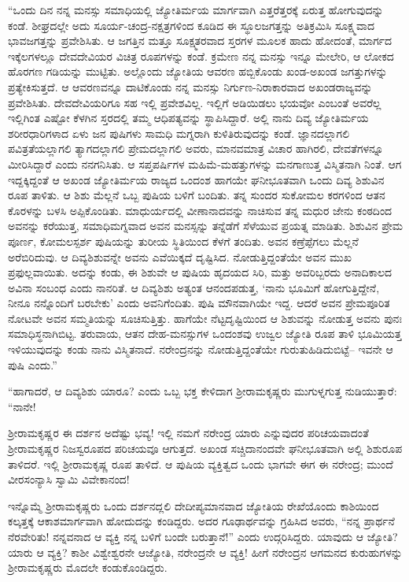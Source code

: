 “ಒಂದು ದಿನ ನನ್ನ ಮನಸ್ಸು ಸಮಾಧಿಯಲ್ಲಿ ಜ್ಯೋತಿರ್ಮಯ ಮಾರ್ಗವಾಗಿ ಎತ್ತರೆತ್ತರಕ್ಕೆ ಏರುತ್ತ ಹೋಗುವುದನ್ನು ಕಂಡೆ. ಶೀಘ್ರದಲ್ಲೇ ಅದು ಸೂರ್ಯ-ಚಂದ್ರ-ನಕ್ಷತ್ರಗಳಿಂದ ಕೂಡಿದ ಈ ಸ್ಥೂಲಜಗತ್ತನ್ನು ಅತಿಕ್ರಮಿಸಿ ಸೂಕ್ಷ್ಮವಾದ ಭಾವಜಗತ್ತನ್ನು ಪ್ರವೇಶಿಸಿತು. ಆ ಜಗತ್ತಿನ ಮತ್ತೂ ಸೂಕ್ಷ್ಮತರವಾದ ಸ್ತರಗಳ ಮೂಲಕ ಹಾದು ಹೋದಂತೆ, ಮಾರ್ಗದ ಇಕ್ಕೆಲಗಳಲ್ಲೂ ದೇವದೇವಿಯರ ವಿಚಿತ್ರ ರೂಪಗಳನ್ನು ಕಂಡೆ. ಕ್ರಮೇಣ ನನ್ನ ಮನಸ್ಸು ಇನ್ನೂ ಮೇಲೇರಿ, ಆ ಲೋಕದ ಹೊರಗಣ ಗಡಿಯನ್ನು ಮುಟ್ಟಿತು. ಅಲ್ಲೊಂದು ಜ್ಯೋತಿಯ ಆವರಣ ಹಬ್ಬಿಕೊಂಡು ಖಂಡ-ಅಖಂಡ ಜಗತ್ತುಗಳನ್ನು ಪ್ರತ್ಯೇಕಿಸುತ್ತದೆ. ಆ ಆವರಣವನ್ನೂ ದಾಟಿಕೊಂಡು ನನ್ನ ಮನಸ್ಸು ನಿರ್ಗುಣ-ನಿರಾಕಾರವಾದ ಅಖಂಡರಾಜ್ಯವನ್ನು ಪ್ರವೇಶಿಸಿತು. ದೇವದೇವಿಯರಿಗೂ ಸಹ ಇಲ್ಲಿ ಪ್ರವೇಶವಿಲ್ಲ. ಇಲ್ಲಿಗೆ ಅಡಿಯಿಡಲು ಭಯವೋ ಎಂಬಂತೆ ಅವರೆಲ್ಲ ಇಲ್ಲಿಗಿಂತ ಎಷ್ಟೋ ಕೆಳಗಿನ ಸ್ತರದಲ್ಲಿ ತಮ್ಮ ಆಧಿಪತ್ಯವನ್ನು ಸ್ಥಾಪಿಸಿದ್ದಾರೆ. ಅಲ್ಲಿ ನಾನು ದಿವ್ಯ ಜ್ಯೋತಿರ್ಮಯ ಶರೀರಧಾರಿಗಳಾದ ಏಳು ಜನ ಪುಷಿಗಳು ಸಾಮಧಿ ಮಗ್ನರಾಗಿ ಕುಳಿತಿರುವುದನ್ನು ಕಂಡೆ. ಜ್ಞಾನದಲ್ಲಾಗಲಿ ಪವಿತ್ರತೆಯಲ್ಲಾಗಲಿ ತ್ಯಾಗದಲ್ಲಾಗಲಿ ಪ್ರೇಮದಲ್ಲಾಗಲಿ ಅವರು, ಮಾನವಮಾತ್ರ ವಿಚಾರ ಹಾಗಿರಲಿ, ದೇವತೆಗಳನ್ನೂ ಮೀರಿಸಿದ್ದಾರೆ ಎಂದು ನನಗನಿಸಿತು. ಆ ಸಪ್ತಪರ್ಷಿಗಳ ಮಹಿಮೆ-ಮಹತ್ತುಗಳನ್ನು ಮನಗಾಣುತ್ತ ವಿಸ್ಮಿತನಾಗಿ ನಿಂತೆ. ಆಗ ಇದ್ದಕ್ಕಿದ್ದಂತೆ ಆ ಅಖಂಡ ಜ್ಯೋತಿರ್ಮಯ ರಾಜ್ಯದ ಒಂದಂಶ ಹಾಗಯೇ ಘನೀಭೂತವಾಗಿ ಒಂದು ದಿವ್ಯ ಶಿಶುವಿನ ರೂಪ ತಾಳಿತು. ಆ ಶಿಶು ಮೆಲ್ಲನೆ ಒಬ್ಬ ಪುಷಿಯ ಬಳಿಗೆ ಬಂದಿತು. ತನ್ನ ಸುಂದರ ಸುಕೋಮಲ ಕರಗಳಿಂದ ಆತನ ಕೊರಳನ್ನು ಬಳಸಿ ಅಪ್ಪಿಕೊಂಡಿತು. ಮಾಧುರ್ಯದಲ್ಲಿ ವೀಣಾನಾದವನ್ನು ನಾಚಿಸುವ ತನ್ನ ಮಧುರ ಜೇನು ಕಂಠದಿಂದ ಅವನನ್ನು ಕರೆಯುತ್ತ, ಸಮಾಧಿಮಗ್ನವಾದ ಅವನ ಮನಸ್ಸನ್ನು ತನ್ನೆಡೆಗೆ ಸೆಳೆಯುವ ಪ್ರಯತ್ನ ಮಾಡಿತು. ಶಿಶುವಿನ ಪ್ರೇಮ ಪೂರ್ಣ, ಕೋಮಲಸ್ಪರ್ಶ ಪುಷಿಯನ್ನು ತುರೀಯ ಸ್ಥಿತಿಯಿಂದ ಕೆಳಗೆ ತಂದಿತು. ಅವನ ಕಣ್ರೆಪ್ಪೆಗಲು ಮೆಲ್ಲನೆ ಅರೆಬಿರಿದುವು. ಆ ದಿವ್ಯಶಿಶುವನ್ನೇ ಅವನು ಎವೆಯಿಕ್ಕದೆ ದೃಷ್ಟಿಸಿದ. ನೋಡುತ್ತಿದ್ದಂತೆಯೇ ಅವನ ಮುಖ ಪ್ರಫುಲ್ಲವಾಯಿತು. ಅದನ್ನು ಕಂಡು, ಈ ಶಿಶುವೇ ಆ ಪುಷಿಯ ಹೃದಯದ ಸಿರಿ, ಮತ್ತು ಅವರಿಬ್ಬರದು ಅನಾದಿಕಾಲದ ಅವಿನಾ ಸಂಬಂಧ ಎಂದು ನಾನರಿತೆ. ಆ ದಿವ್ಯಶಿಶು ಅತ್ಯಂತ ಆನಂದಪಡುತ್ತ, ‘ನಾನು ಭೂಮಿಗೆ ಹೋಗುತ್ತಿದ್ದೇನೆ, ನೀನೂ ನನ್ನೊಂದಿಗೆ ಬರಬೇಕು’ ಎಂದು ಅವನಿಗೆಂದಿತು. ಪುಷಿ ಮೌನವಾಗಿಯೇ ಇದ್ದ. ಆದರೆ ಅವನ ಪ್ರೇಮಪೂರಿತ ನೋಟವೇ ಅವನ ಸಮ್ಮತಿಯನ್ನು ಸೂಚಿಸುತ್ತಿತ್ತು. ಹಾಗೆಯೇ ನೆಟ್ಟದೃಷ್ಟಿಯಿಂದ ಆ ಶಿಶುವನ್ನು ನೋಡುತ್ತ ಅವನು ಪುನಃ ಸಮಾಧಿಸ್ಥನಾಗಿಬಿಟ್ಟ. ತರುವಾಯ, ಆತನ ದೇಹ-ಮನಸ್ಸುಗಳ ಒಂದಂಶವು ಉಜ್ವಲ ಜ್ಯೋತಿ ರೂಪ ತಾಳಿ ಭೂಮಿಯತ್ತ ಇಳಿಯುವುದನ್ನು ಕಂಡು ನಾನು ವಿಸ್ಮಿತನಾದೆ. ನರೇಂದ್ರನನ್ನು ನೋಡುತ್ತಿದ್ದಂತೆಯೇ ಗುರುತುಹಿಡಿದುಬಿಟ್ಟೆ– ಇವನೇ ಆ ಪುಷಿ ಎಂದು.”

“ಹಾಗಾದರೆ, ಆ ದಿವ್ಯಶಿಶು ಯಾರೂ? ಎಂದು ಒಬ್ಬ ಭಕ್ತ ಕೇಳಿದಾಗ ಶ್ರೀರಾಮಕೃಷ್ಣರು ಮುಗುಳ್ನಗುತ್ತ ನುಡಿಯುತ್ತಾರೆ: “ನಾನೇ!

ಶ್ರೀರಾಮಕೃಷ್ಣರ ಈ ದರ್ಶನ ಅದೆಷ್ಟು ಭವ್ಯ! ಇಲ್ಲಿ ನಮಗೆ ನರೇಂದ್ರ ಯಾರು ಎನ್ನುವುದರ ಪರಿಚಯವಾದಂತೆ ಶ್ರೀರಾಮಕೃಷ್ಣರ ನಿಜಸ್ವರೂಪದ ಪರಿಚಯವೂ ಆಗುತ್ತದೆ. ಅಖಂಡ ಸಚ್ಚಿದಾನಂದವೇ ಘನೀಭೂತವಾಗಿ ಅಲ್ಲಿ ಶಿಶುರೂಪ ತಾಳಿದರೆ. ಇಲ್ಲಿ ಶ್ರೀರಾಮಕೃಷ್ಣ ರೂಪ ತಾಳಿದೆ. ಆ ಪುಷಿಯ ವ್ಯಕ್ತಿತ್ವದ ಒಂದು ಭಾಗವೇ ಈಗ ಈ ನರೇಂದ್ರ; ಮುಂದೆ ವೀರಸಂನ್ಯಾಸಿ ಸ್ವಾಮಿ ವಿವೇಕಾನಂದ!

ಇನ್ನೊಮ್ಮೆ ಶ್ರೀರಾಮಕೃಷ್ಣರು ಒಂದು ದರ್ಶನದ್ಲಲಿ ದೇದೀಪ್ಯಮಾನವಾದ ಜ್ಯೋತಿಯ ರೇಖೆಯೊಂದು ಕಾಶಿಯಿಂದ ಕಲ್ಕತ್ತಕ್ಕೆ ಆಕಾಶಮಾರ್ಗವಾಗಿ ಹೋದುದನ್ನು ಕಂಡಿದ್ದರು. ಅದರ ಗೂಢಾರ್ಥವನ್ನು ಗ್ರಹಿಸಿದ ಅವರು, “ನನ್ನ ಪ್ರಾರ್ಥನೆ ನೆರವೇರಿತು! ನನ್ನವನಾದ ಆ ವ್ಯಕ್ತಿ ನನ್ನ ಬಳಿಗೆ ಬಂದೇ ಬರುತ್ತಾನೆ!” ಎಂದು ಉದ್ಗರಿಸಿದ್ದರು. ಯಾವುದು ಆ ಜ್ಯೋತಿ? ಯಾರು ಆ ವ್ಯಕ್ತಿ? ಕಾಶೀ ವಿಶ್ವೇಶ್ವರನೇ ಆಜ್ಯೋತಿ, ನರೇಂದ್ರನೇ ಆ ವ್ಯಕ್ತಿ! ಹೀಗೆ ನರೇಂದ್ರನ ಆಗಮನದ ಕುರುಹುಗಳನ್ನು ಶ್ರೀರಾಮಕೃಷ್ಣರು ಮೊದಲೇ ಕಂಡುಕೊಂಡಿದ್ದರು.

